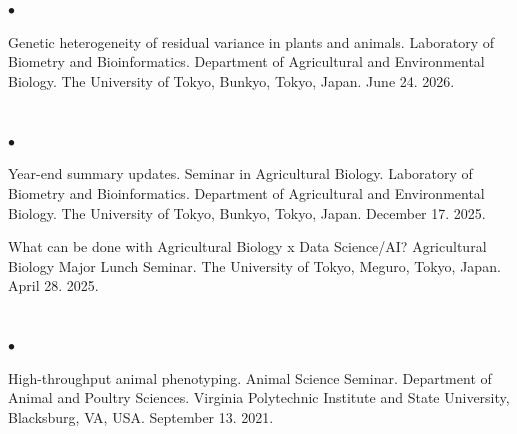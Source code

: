 \documentclass[margin,line,10pt]{res}
\newenvironment{list2}{
  \begin{list}{$\bullet$}{%
      \setlength{\itemsep}{0in}
      \setlength{\parsep}{0in} \setlength{\parskip}{0in}
      \setlength{\topsep}{0in} \setlength{\partopsep}{0in} 
      \setlength{\leftmargin}{0.2in}}}{\end{list}}
\begin{document}
\begin{resume}
\section{}
\begin{list2}

  \item  [{\bf 21}.]  Genetic heterogeneity of residual variance in plants and animals. Laboratory of Biometry and Bioinformatics. Department of Agricultural and Environmental Biology. The University of Tokyo, Bunkyo, Tokyo, Japan. June 24. 2026. 

\end{list2}






\section{}
\begin{list2}

  \item  [{\bf 20}.] Year-end summary updates. Seminar in Agricultural Biology. Laboratory of Biometry and Bioinformatics. Department of Agricultural and Environmental Biology. The University of Tokyo, Bunkyo, Tokyo, Japan. December 17. 2025. %

  \vspace{0.5cm}


  \item  [{\bf 19}.] What can be done with Agricultural Biology x Data Science/AI? Agricultural Biology Major Lunch Seminar. The University of Tokyo, Meguro, Tokyo, Japan. April 28. 2025. %

\end{list2}





\section{}
\begin{list2}

  \item  [{\bf 18}.] High-throughput animal phenotyping. Animal Science Seminar. Department of Animal and Poultry Sciences. Virginia Polytechnic Institute and State University, Blacksburg, VA, USA. September 13. 2021. 

    \vspace{0.5cm}



\end{list2}
\end{resume}
\end{document}
